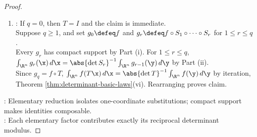 \begin{theorem}
\begin{proof}
\begin{enumerate}[label=(\roman*)]
\begin{enumerate}[label=(\alph*)]
Positive scaling by $\abs c$ then proves the same identity. Finally, $\abs{\det S}=\abs c$ by Theorem \ref{thm:determinant-basic-laws}(v).
\item Suppose $S$ swaps coordinates $i$ and $j$. Then $S(C)=C$, so $C$ contains both supports.\\
Renaming the two dummy variables converts the iterated integral of $g\circ S$ into order obtained by swapping $i$ and $j$ for $g$.\\
The integrals are equal by Theorem \ref{thm:iterated-integrals-order-independent}. Moreover, $\abs{\det S}=1$ by Theorem \ref{thm:determinant-basic-laws}(i),(iii),(ix).
\item Suppose $S\x=\x+cx_j\mathbf e_i$ with $i\neq j$, and set $D\defeq\{\x:\abs{x_i}\leq(1+\abs c)M,\ \abs{x_k}\leq M\ (k\neq i)\}$.\\
Then $D\supseteq\operatorname{supp}(g\circ S)$. Integrate in $x_i$ first by Theorem \ref{thm:iterated-integrals-order-independent}.\\
For fixed remaining coordinates, the translated $x_i$-interval contains $[-M,M]$, outside which the slice of $g$ vanishes. Its integral therefore equals the integral over $[-M,M]$ by Theorem \ref{thm:riemann-stieltjes-change-of-variable}(v) and interval additivity.\\
Thus the two cell integrals are equal, and $\det S=1$ by Theorem \ref{thm:determinant-basic-laws}(v).
\end{enumerate}
\item {}: If $q=0$, then $T=I$ and the claim is immediate.\\
Suppose $q\geq1$, and set $g_0\defeq f$ and $g_r\defeq f\circ S_1\circ\cdots\circ S_r$ for $1\leq r\leq q$.\\
Every $g_r$ has compact support by Part (i). For $1\leq r\leq q$, $\int_{\R^n}g_r(\x)\,d\x=\abs{\det S_r}^{-1}\int_{\R^n}g_{r-1}(\y)\,d\y$ by Part (ii).\\
Since $g_q=f\circ T$, $\int_{\R^n}f(T\x)\,d\x=\abs{\det T}^{-1}\int_{\R^n}f(\y)\,d\y$ by iteration, Theorem \ref{thm:determinant-basic-laws}(vi). Rearranging proves claim.
\end{enumerate}
: Elementary reduction isolates one-coordinate substitutions; compact support makes identities composable.\\
: Each elementary factor contributes exactly its reciprocal determinant modulus.
\end{proof}
\end{theorem}

